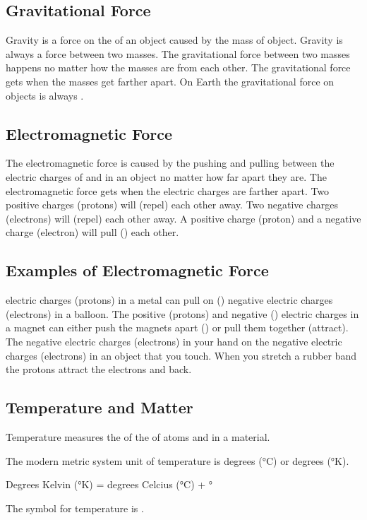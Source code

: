 \documentclass[12pt]{exam}
\begin{document}
\begin{questions}
\subsection{Gravitational Force}

\question Gravity is a force on the \fillin of an object caused by the mass of \fillin object.
\question Gravity is always a \fillin force between two masses.
\question The gravitational force between two masses happens no matter how \fillin the masses are from each other.
\question The gravitational force gets \fillin when the masses get farther apart.
\question On Earth the gravitational force on objects is always \fillin.

\subsection{Electromagnetic Force}

\question The electromagnetic force is caused by the pushing and pulling between the electric charges of \fillin and \fillin in an object no matter how far apart they are.
\question The electromagnetic force gets \fillin when the electric charges are farther apart.
\question Two positive charges (protons) will \fillin (repel) each other away.
\question Two negative charges (electrons) will \fillin (repel) each other away.
\question A positive charge (proton) and a negative charge (electron) will pull (\fillin) each other.

\subsection{Examples of Electromagnetic Force}

\question \fillin electric charges (protons) in a metal can pull on (\fillin) negative electric charges (electrons) in a balloon.
\question The positive (protons) and negative (\fillin) electric charges in a magnet can either push the magnets apart (\fillin) or pull them together (attract).
\question The negative electric charges (electrons) in your hand \fillin on the negative electric charges (electrons) in an object that you touch.
\question When you stretch a rubber band the protons attract the electrons and \fillin back.

\pagebreak

\subsection{Temperature and Matter}


\question Temperature measures the \fillin of the \fillin of atoms and \fillin in a material.

\question The modern metric system unit of temperature is degrees \fillin (°C) or degrees \fillin (°K).

\question Degrees Kelvin (°K) = degrees Celcius (°C) + \fillin°

\question The symbol for temperature is \fillin.


\end{questions}
\end{document}
